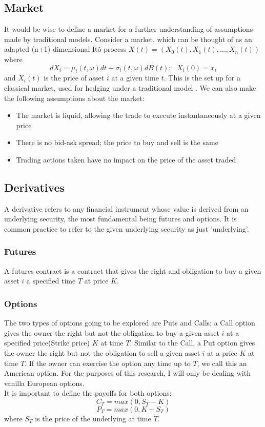 \documentclass[12pt]{article}
\numberwithin{equation}{section}
\begin{document}
\subsection{Market}
It would be wise to define a market for a further understanding of assumptions 
made by traditional models. 
Consider a market, which can be thought of as an adapted (n+1) dimensional 
It\^{o} process 
$X(t) = (X_0(t), X_1(t),...,X_n(t))$
where 
\begin{equation}
dX_i = \mu_i(t,\omega)dt+\sigma_i(t,\omega)dB(t);\hspace{8pt}X_i(0)=x_i 
\end{equation}
and $X_i(t)$ is the price of asset $i$ at a given time $t$. This is the set up 
for a classical market, used for hedging under a traditional model \autocite{wallace}.
We can also make the following assumptions about the market:
\begin{itemize}
  \item The market is liquid, allowing the trade to execute instantaneously at a 
    given price
  \item There is no bid-ask spread; the price to buy and sell is the same 
  \item Trading actions taken have no impact on the price of the asset traded 
\end{itemize}


\subsection{Derivatives}
A derivative refers to any financial instrument whose value is derived from an 
underlying security, the most fundamental being futures and options. It is common 
practice to refer to the given underlying security as just 'underlying'.
\subsubsection{Futures}
A futures contract is a contract that gives the right and obligation to buy a 
given asset $i$ a specified time $T$ at price $K$. 
\subsubsection{Options}
The two types of options going to be explored are Puts and Calls; a Call option 
gives the owner the right but not the obligation to buy a given asset $i$ at 
a specified price(Strike price) $K$ at time $T$. Similar to the Call, a Put option gives the 
owner the right but not the obligation to sell a given asset $i$ at a price $K$ 
at time $T$. If the owner can exercise the option any time up to $T$, we call 
this an American option. For the purposes of this research, I will only be 
dealing with vanilla European options.\\ 
It is important to define the payoffs for both options: 
\begin{equation}
C_T = max(0,S_T-K)
\end{equation}
\begin{equation}
P_T = max(0,K-S_T)
\end{equation}
where $S_T$ is the price of the underlying at time $T$. 
\end{document}
